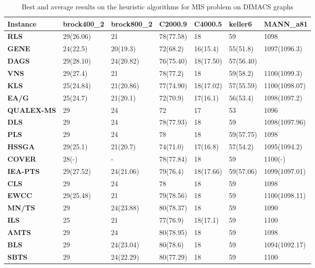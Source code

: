 \begin{table}[!ht]
    \centering
    \begin{tabular}{|l|l|l|l|l|l|l|}
    \hline
        \textbf{Instance} & \textbf{brock400\_2} & \textbf{brock800\_2} & \textbf{C2000.9} & \textbf{C4000.5} & \textbf{keller6} & \textbf{MANN\_a81} \\ \hline
        \textbf{RLS} & 29(26.06) & 21 & 78(77.58) & 18 & 59 & 1098 \\ \hline
        \textbf{GENE} & 24(22.5) & 20(19.3) & 72(68.2) & 16(15.4) & 55(51.8) & 1097(1096.3) \\ \hline
        \textbf{DAGS} & 29(28.10) & 24(20.82) & 76(75.40) & 18(17.50) & 57(56.40) & ~ \\ \hline
        \textbf{VNS} & 29(27.4) & 21 & 78(77.2) & 18 & 59(58.2) & 1100(1099.3) \\ \hline
        \textbf{KLS} & 25(24.84) & 21(20.86) & 77(74.90) & 18(17.02) & 57(55.59) & 1100(1098.07) \\ \hline
        \textbf{EA/G} & 25(24.7) & 21(20.1) & 72(70.9) & 17(16.1) & 56(53.4) & 1098(1097.2) \\ \hline
        \textbf{QUALEX-MS} & 29 & 24 & 72 & 17 & 53 & 1096 \\ \hline
        \textbf{DLS} & 29 & 24 & 78(77.93) & 18 & 59 & 1098(1097.96) \\ \hline
        \textbf{PLS} & 29 & 24 & 78 & 18 & 59(57.75) & 1098 \\ \hline
        \textbf{HSSGA} & 29(25.1) & 21(20.7) & 74(71.0) & 17(16.8) & 57(54.2) & 1095(1094.2) \\ \hline
        \textbf{COVER} & 28(-) & - & 78(77.84) & 18 & 59 & 1100(-) \\ \hline
        \textbf{IEA-PTS} & 29(27.52) & 24(21.06) & 79(76.4) & 18(17.66) & 59(57.06) & 1099(1097.01) \\ \hline
        \textbf{CLS} & 29 & 24 & 78 & 18 & 59 & 1098 \\ \hline
        \textbf{EWCC} & 29(25.48) & 21 & 79(78.56) & 18 & 59 & 1100(1098.11) \\ \hline
        \textbf{MN/TS} & 29 & 24(23.88) & 80(78.37) & 18 & 59 & 1090 \\ \hline
        \textbf{ILS} & 25 & 21 & 77(76.9) & 18(17.1) & 59 & 1100 \\ \hline
        \textbf{AMTS} & 29 & 24 & 80(78.95) & 18 & 59 & 1098 \\ \hline
        \textbf{BLS} & 29 & 24(23.04) & 80(78.6) & 18 & 59 & 1094(1092.17) \\ \hline
        \textbf{SBTS} & 29 & 24(22.29) & 80(77.29) & 18 & 59 & 1100 \\ \hline
    \end{tabular}
    \caption{Best and average results on the heuristic algorithms for MIS problem on DIMACS graphs}
    \label{table:heuristic_algorithms_results}
\end{table}

